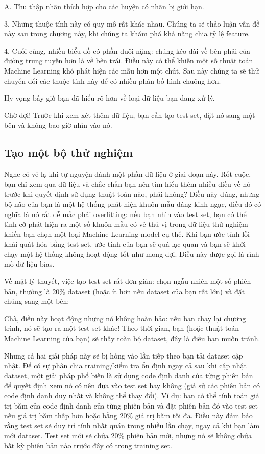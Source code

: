 A. Thu thập nhãn thích hợp cho các huyện có nhãn bị giới hạn.

3. Những thuộc tính này có quy mô rất khác nhau. Chúng ta sẽ thảo luận vấn đề này sau trong chương này, khi chúng ta khám phá khả năng chia tỷ lệ feature.

4. Cuối cùng, nhiều biểu đồ có phần đuôi nặng: chúng kéo dài về bên phải của đường trung tuyến hơn là về bên trái. Điều này có thể khiến một số thuật toán Machine Learning khó phát hiện các mẫu hơn một chút. Sau này chúng ta sẽ thử chuyển đổi các thuộc tính này để có nhiều phân bố hình chuông hơn.

Hy vọng bây giờ bạn đã hiểu rõ hơn về loại dữ liệu bạn đang xử lý.

Chờ đợi! Trước khi xem xét thêm dữ liệu, bạn cần tạo test set, đặt nó sang một bên và không bao giờ nhìn vào nó.

\subsection{Tạo một bộ thử nghiệm}

Nghe có vẻ lạ khi tự nguyện dành một phần dữ liệu ở giai đoạn này. Rốt cuộc, bạn chỉ xem qua dữ liệu và chắc chắn bạn nên tìm hiểu thêm nhiều điều về nó trước khi quyết định sử dụng thuật toán nào, phải không? Điều này đúng, nhưng bộ não của bạn là một hệ thống phát hiện khuôn mẫu đáng kinh ngạc, điều đó có nghĩa là nó rất dễ mắc phải overfitting: nếu bạn nhìn vào test set, bạn có thể tình cờ phát hiện ra một số khuôn mẫu có vẻ thú vị trong dữ liệu thử nghiệm khiến bạn chọn một loại Machine Learning model cụ thể. Khi bạn ước tính lỗi khái quát hóa bằng test set, ước tính của bạn sẽ quá lạc quan và bạn sẽ khởi chạy một hệ thống không hoạt động tốt như mong đợi. Điều này được gọi là rình mò dữ liệu bias.

Về mặt lý thuyết, việc tạo test set rất đơn giản: chọn ngẫu nhiên một số phiên bản, thường là 20\% dataset (hoặc ít hơn nếu dataset của bạn rất lớn) và đặt chúng sang một bên:

Chà, điều này hoạt động nhưng nó không hoàn hảo: nếu bạn chạy lại chương trình, nó sẽ tạo ra một test set khác! Theo thời gian, bạn (hoặc thuật toán Machine Learning của bạn) sẽ thấy toàn bộ dataset, đây là điều bạn muốn tránh.

Nhưng cả hai giải pháp này sẽ bị hỏng vào lần tiếp theo bạn tải dataset cập nhật. Để có sự phân chia training/kiểm tra ổn định ngay cả sau khi cập nhật dataset, một giải pháp phổ biến là sử dụng code định danh của từng phiên bản để quyết định xem nó có nên đưa vào test set hay không (giả sử các phiên bản có code định danh duy nhất và không thể thay đổi). Ví dụ: bạn có thể tính toán giá trị băm của code định danh của từng phiên bản và đặt phiên bản đó vào test set nếu giá trị băm thấp hơn hoặc bằng 20\% ​​giá trị băm tối đa. Điều này đảm bảo rằng test set sẽ duy trì tính nhất quán trong nhiều lần chạy, ngay cả khi bạn làm mới dataset. Test set mới sẽ chứa 20\% phiên bản mới, nhưng nó sẽ không chứa bất kỳ phiên bản nào trước đây có trong training set.

